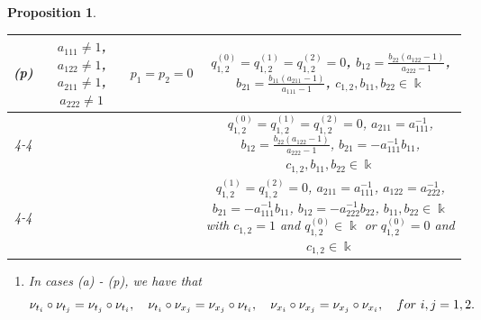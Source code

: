 \documentclass{amsart}
\newtheorem{proposition}[theorem]{Proposition}
\theoremstyle{definition}
\theoremstyle{remark}
\numberwithin{equation}{section}
\begin{document}
\begin{proposition}
\begin{table}[h]
\begin{center}
{\begin{tabular}{ |c|c|c|c| }
\hline
\multirow{3}{*}{{\rm (p)}} & \multirow{3}{*}{$a_{111} \not=1$, $a_{122}\not=1$, $a_{211}\not=1$, $a_{222}\not=1$} & \multirow{3}{*}{$p_1=p_2=0$} & $q_{1,2}^{(0)}=q_{1,2}^{(1)}=q_{1,2}^{(2)}=0$, $b_{12}=\frac{b_{22}(a_{122}-1)}{a_{222}-1}$, $b_{21}=\frac{b_{11}(a_{211}-1)}{a_{111}-1}$, $c_{1,2},  b_{11}, b_{22}\in\Bbbk$ \\ \cline{4-4}
 &  &  & $q_{1,2}^{(0)}=q_{1,2}^{(1)}=q_{1,2}^{(2)}=0$, $a_{211}=a_{111}^{-1}$, $b_{12}=\frac{b_{22}(a_{122}-1)}{a_{222}-1}$, $b_{21}=-a_{111}^{-1}b_{11}$, $c_{1,2},  b_{11}, b_{22}\in\Bbbk$ \\ \cline{4-4}
 &  &  & $q_{1,2}^{(1)}=q_{1,2}^{(2)}=0$, $a_{211}=a_{111}^{-1}$, $a_{122}=a_{222}^{-1}$, $b_{21}=-a_{111}^{-1}b_{11}$, $b_{12}=-a_{222}^{-1}b_{22}$, $b_{11}, b_{22}\in\Bbbk$ {\rm with} $c_{1,2}=1$ and $q_{1,2}^{(0)}\in\Bbbk$ or $q_{1,2}^{(0)}=0$ and $c_{1,2}\in\Bbbk$\\ 
\hline
\end{tabular}
}
\end{center}
\end{table}

\begin{enumerate}
\item [\rm (2)] In cases {\rm (a) - (p)}, we have that 
    \begin{equation}\label{Eq1skew2}
   \nu_{t_i} \circ \nu_{t_j} = \nu_{t_j} \circ \nu_{t_i}, \quad \nu_{t_i} \circ \nu_{x_j} = \nu_{x_j} \circ \nu_{t_i}, \quad \nu_{x_i} \circ \nu_{x_j} = \nu_{x_j} \circ \nu_{x_i}, \quad {\rm for}\ i,j =1, 2.
    \end{equation}
\end{enumerate}
\end{proposition}
\end{document}
